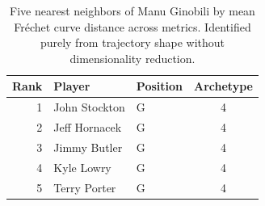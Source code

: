 \begin{table}[htbp]
  \centering\small
  \begin{tabular}{rllc}
    \toprule
    Rank & Player & Position & Archetype \\
    \midrule
    1 & John Stockton & G & 4 \\
    2 & Jeff Hornacek & G & 4 \\
    3 & Jimmy Butler & G & 4 \\
    4 & Kyle Lowry & G & 4 \\
    5 & Terry Porter & G & 4 \\
    \bottomrule
  \end{tabular}
  \caption{Five nearest neighbors of Manu Ginobili by mean Fr\'{e}chet curve distance across metrics. Identified purely from trajectory shape without dimensionality reduction.}
  \label{tab:Manu_Ginobili_frechet_curve_neighbors}
\end{table}

